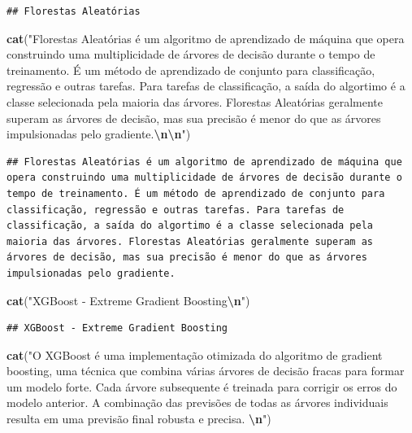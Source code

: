\documentclass[
]{article}
\newenvironment{Shaded}{\begin{snugshade}}{\end{snugshade}}
\newcommand{\FunctionTok}[1]{\textcolor[rgb]{0.13,0.29,0.53}{\textbf{#1}}}
\newcommand{\NormalTok}[1]{#1}
\newcommand{\SpecialCharTok}[1]{\textcolor[rgb]{0.81,0.36,0.00}{\textbf{#1}}}
\newcommand{\StringTok}[1]{\textcolor[rgb]{0.31,0.60,0.02}{#1}}
\begin{document}
\begin{verbatim}
## Florestas Aleatórias
\end{verbatim}

\begin{Shaded}
\begin{Highlighting}[]
\FunctionTok{cat}\NormalTok{(}\StringTok{"Florestas Aleatórias é um algoritmo de aprendizado de máquina que opera construindo uma multiplicidade de árvores de decisão durante o tempo de treinamento. É um método de aprendizado de conjunto para classificação, regressão e outras tarefas. Para tarefas de classificação, a saída do algortimo é a classe selecionada pela maioria das árvores. Florestas Aleatórias geralmente superam as árvores de decisão, mas sua precisão é menor do que as árvores impulsionadas pelo gradiente.}\SpecialCharTok{\textbackslash{}n\textbackslash{}n}\StringTok{"}\NormalTok{)}
\end{Highlighting}
\end{Shaded}

\begin{verbatim}
## Florestas Aleatórias é um algoritmo de aprendizado de máquina que opera construindo uma multiplicidade de árvores de decisão durante o tempo de treinamento. É um método de aprendizado de conjunto para classificação, regressão e outras tarefas. Para tarefas de classificação, a saída do algortimo é a classe selecionada pela maioria das árvores. Florestas Aleatórias geralmente superam as árvores de decisão, mas sua precisão é menor do que as árvores impulsionadas pelo gradiente.
\end{verbatim}

\begin{Shaded}
\begin{Highlighting}[]
\FunctionTok{cat}\NormalTok{(}\StringTok{"XGBoost {-} Extreme Gradient Boosting}\SpecialCharTok{\textbackslash{}n}\StringTok{"}\NormalTok{)}
\end{Highlighting}
\end{Shaded}

\begin{verbatim}
## XGBoost - Extreme Gradient Boosting
\end{verbatim}

\begin{Shaded}
\begin{Highlighting}[]
\FunctionTok{cat}\NormalTok{(}\StringTok{"O XGBoost é uma implementação otimizada do algoritmo de gradient boosting, uma técnica que combina várias árvores de decisão fracas para formar um modelo forte. Cada árvore subsequente é treinada para corrigir os erros do modelo anterior. A combinação das previsões de todas as árvores individuais resulta em uma previsão final robusta e precisa. }\SpecialCharTok{\textbackslash{}n}\StringTok{"}\NormalTok{)}
\end{Highlighting}
\end{Shaded}
\end{document}
